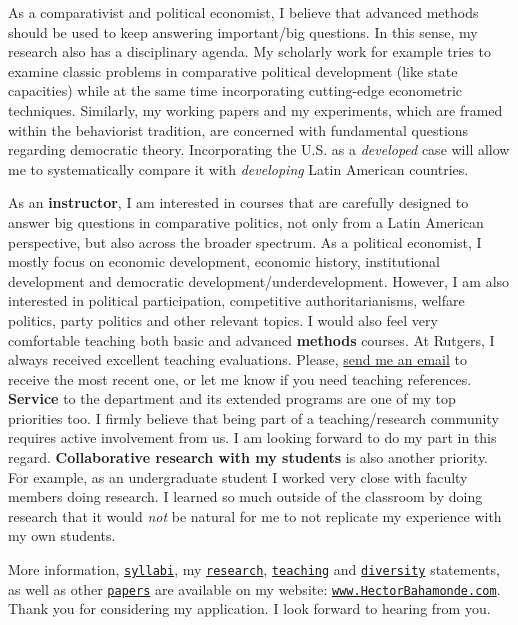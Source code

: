 \documentclass[10pt,stdletter,dateno,sigleft]{newlfm} %
\begin{document}
\begin{newlfm}
As a comparativist and political economist, I believe that advanced methods should be used to keep answering important/big questions. In this sense, my research also has a disciplinary agenda. My scholarly work for example tries to examine classic problems in comparative political development (like state capacities) while at the same time incorporating cutting-edge econometric techniques. Similarly, my working papers and my experiments, which are framed within the behaviorist tradition, are concerned with fundamental questions regarding democratic theory. Incorporating the U.S. as a \emph{developed} case will allow me to systematically compare it with \emph{developing} Latin American countries.

As an {\bf instructor}, I am interested in courses that are carefully designed to answer big questions in comparative politics, not only from a Latin American perspective, but also across the broader spectrum. As a political economist, I mostly focus on economic development, economic history, institutional development and democratic development/underdevelopment. However, I am also interested in political participation, competitive authoritarianisms, welfare politics, party politics and other relevant topics. I would also feel very comfortable teaching both basic and advanced {\bf methods} courses. At Rutgers, I always received excellent teaching evaluations. Please, \href{mailto:bahamondeh@gmail.com}{send me an email} to receive the most recent one, or let me know if you need teaching references. {\bf Service} to the department and its extended programs are one of my top priorities too. I firmly believe that being part of a teaching/research community requires active involvement from us. I am looking forward to do my part in this regard. {\bf Collaborative research with my students} is also another priority. For example, as an undergraduate student I worked very close with faculty members doing research. I learned so much outside of the classroom by doing research that it would \emph{not} be natural for me to not replicate my experience with my own students. 



More information, \href{http://www.hectorbahamonde.com/teaching/}{\texttt{syllabi}}, my \href{http://github.com/hbahamonde/Job_Market/raw/master/Bahamonde_Research_Statement.pdf}{\texttt{research}}, \href{http://github.com/hbahamonde/Job_Market/raw/master/Bahamonde_Teaching_Statement.pdf}{\texttt{teaching}} and \href{http://github.com/hbahamonde/Job_Market/raw/master/Bahamonde_Diversity_Statement.pdf}{\texttt{diversity}} statements, as well as other \href{http://www.hectorbahamonde.com/research/}{\texttt{papers}} are available on my website: \href{http://www.hectorbahamonde.com}{\texttt{www.HectorBahamonde.com}}. Thank you for considering my application. I look forward to hearing from you.






\end{newlfm}
\end{document}
